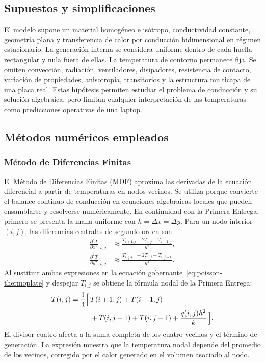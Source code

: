 \subsection{Supuestos y simplificaciones}

El modelo supone un material homog\'eneo e is\'otropo, conductividad constante, geometr\'ia plana y transferencia de calor por conducci\'on bidimensional en r\'egimen estacionario. La generaci\'on interna se considera uniforme dentro de cada huella rectangular y nula fuera de ellas. La temperatura de contorno permanece fija. Se omiten convecci\'on, radiaci\'on, ventiladores, disipadores, resistencia de contacto, variaci\'on de propiedades, anisotrop\'ia, transitorios y la estructura multicapa de una placa real. Estas hip\'otesis permiten estudiar el problema de conducci\'on y su soluci\'on algebraica, pero limitan cualquier interpretaci\'on de las temperaturas como predicciones operativas de una laptop.

\subsection{M\'etodos num\'ericos empleados}

\subsubsection{M\'etodo de Diferencias Finitas}

El M\'etodo de Diferencias Finitas (MDF) aproxima las derivadas de la ecuaci\'on diferencial a partir de temperaturas en nodos vecinos. Se utiliza porque convierte el balance continuo de conducci\'on en ecuaciones algebraicas locales que pueden ensamblarse y resolverse num\'ericamente. En continuidad con la Primera Entrega, primero se presenta la malla uniforme con $h=\Delta x=\Delta y$. Para un nodo interior $(i,j)$, las diferencias centrales de segundo orden son
\begin{align}
\frac{\partial^2T}{\partial x^2}\bigg|_{i,j}
&\approx \frac{T_{i+1,j}-2T_{i,j}+T_{i-1,j}}{h^2},\\
\frac{\partial^2T}{\partial y^2}\bigg|_{i,j}
&\approx \frac{T_{i,j+1}-2T_{i,j}+T_{i,j-1}}{h^2}.
\end{align}
Al sustituir ambas expresiones en la ecuaci\'on gobernante~\eqref{eq:poisson-thermoplate} y despejar $T_{i,j}$ se obtiene la f\'ormula nodal de la Primera Entrega:
\begin{equation}
\begin{aligned}
T(i,j)=\frac{1}{4}\Bigl[\,&T(i+1,j)+T(i-1,j)\\
&+T(i,j+1)+T(i,j-1)+\frac{q(i,j)h^2}{k}\,\Bigr].
\end{aligned}
\label{eq:nodal-uniforme}
\end{equation}
El divisor cuatro afecta a la suma completa de los cuatro vecinos y el t\'ermino de generaci\'on. La expresi\'on muestra que la temperatura nodal depende del promedio de los vecinos, corregido por el calor generado en el volumen asociado al nodo.


